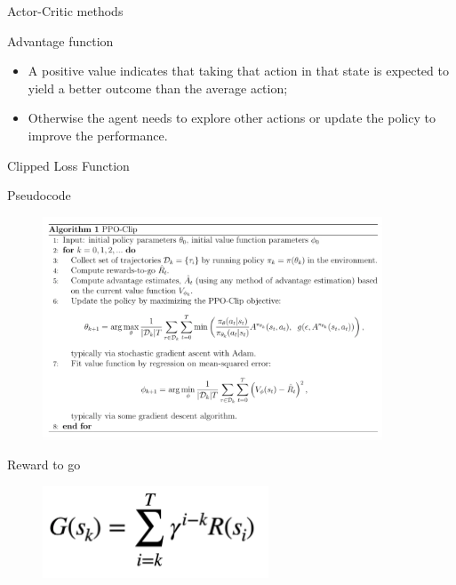 \documentclass[presentation]{beamer}\mode<presentation>{\usetheme{AMSBolognaFC}}
\begin{document}
\begin{frame}[allowframebreaks]{Actor-Critic methods}
\begin{exampleblock}{Advantage function}
	\begin{itemize}
		\item A positive value indicates that  taking that action in that state is expected to yield a better
			outcome than the average action;
		\item Otherwise the agent needs to explore 
			other actions or update the policy to improve the performance.
	\end{itemize}
\end{exampleblock}

\end{frame}

\begin{frame}{Clipped Loss Function}


\end{frame}


\begin{frame}{Pseudocode}
\begin{figure}
	\includegraphics[width=0.9\textwidth]{img/PPO-pseudocode.pdf}
\end{figure}
\end{frame}

\begin{frame}{Reward to go}
\begin{figure}
	\includegraphics[width=0.6\textwidth]{img/reward-to-go.pdf}
\end{figure}	
\end{frame}
\end{document}
